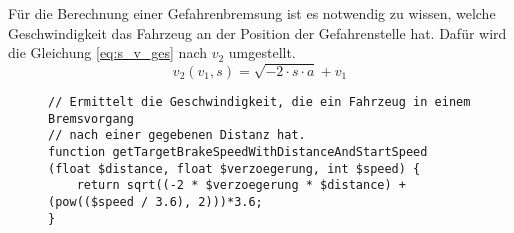 Für die Berechnung einer Gefahrenbremsung ist es notwendig zu wissen, welche Geschwindigkeit das Fahrzeug an der Position der Gefahrenstelle hat. Dafür wird die Gleichung \eqref{eq:s_v_ges} nach $v_{2}$ umgestellt.
\begin{equation}
\label{eq:gefahrenbremsung}
v_{2}(v_{1}, s) = \sqrt{-2 \cdot s \cdot a} + v_{1}
\end{equation}
\begin{figure}[H]
\begin{lstlisting}[caption={\textit{getTargetBrakeSpeedWithDistanceAndStartSpeed$($$)$} (\textit{func\-tions\_""math\-.php})},captionpos=b,label={lst:getTargetBrakeSpeedWithDistanceAndStartSpeed}]
// Ermittelt die Geschwindigkeit, die ein Fahrzeug in einem Bremsvorgang
// nach einer gegebenen Distanz hat.
function getTargetBrakeSpeedWithDistanceAndStartSpeed (float $distance, float $verzoegerung, int $speed) {
	return sqrt((-2 * $verzoegerung * $distance) + (pow(($speed / 3.6), 2)))*3.6;
}
\end{lstlisting}
\end{figure}
